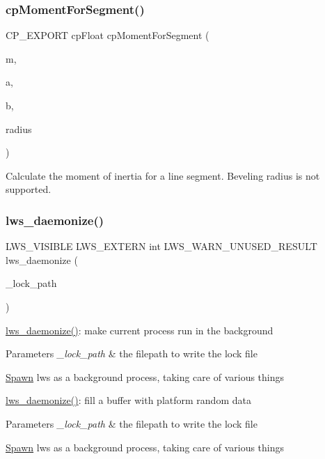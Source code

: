 \subsubsection{\texorpdfstring{cp\+Moment\+For\+Segment()}{cpMomentForSegment()}}
{\footnotesize\ttfamily C\+P\+\_\+\+E\+X\+P\+O\+RT cp\+Float cp\+Moment\+For\+Segment (\begin{DoxyParamCaption}\item[{cp\+Float}]{m,  }\item[{\hyperlink{structcpVect}{cp\+Vect}}]{a,  }\item[{\hyperlink{structcpVect}{cp\+Vect}}]{b,  }\item[{cp\+Float}]{radius }\end{DoxyParamCaption})}

Calculate the moment of inertia for a line segment. Beveling radius is not supported. \mbox{\label{group__misc_gace5171b1dbbc03ec89a98f8afdb5c9af}} 
\subsubsection{\texorpdfstring{lws\+\_\+daemonize()}{lws\_daemonize()}}
{\footnotesize\ttfamily L\+W\+S\+\_\+\+V\+I\+S\+I\+B\+LE L\+W\+S\+\_\+\+E\+X\+T\+E\+RN int L\+W\+S\+\_\+\+W\+A\+R\+N\+\_\+\+U\+N\+U\+S\+E\+D\+\_\+\+R\+E\+S\+U\+LT lws\+\_\+daemonize (\begin{DoxyParamCaption}\item[{const char $\ast$}]{\+\_\+lock\+\_\+path }\end{DoxyParamCaption})}

\hyperlink{group__misc_gace5171b1dbbc03ec89a98f8afdb5c9af}{lws\+\_\+daemonize()}\+: make current process run in the background


\begin{DoxyParams}{Parameters}
{\em \+\_\+lock\+\_\+path} & the filepath to write the lock file\\
\hline
\end{DoxyParams}
\hyperlink{classSpawn}{Spawn} lws as a background process, taking care of various things

\hyperlink{group__misc_gace5171b1dbbc03ec89a98f8afdb5c9af}{lws\+\_\+daemonize()}\+: fill a buffer with platform random data


\begin{DoxyParams}{Parameters}
{\em \+\_\+lock\+\_\+path} & the filepath to write the lock file\\
\hline
\end{DoxyParams}
\hyperlink{classSpawn}{Spawn} lws as a background process, taking care of various things \mbox{\label{group__misc_ga7fc9fe90471eb724ba314baa21e5e18c}} 
